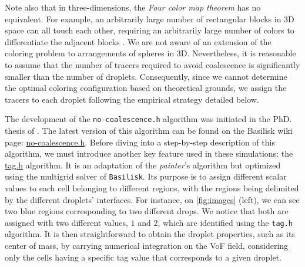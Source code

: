 \documentclass[11pt]{My_preprint}
\begin{document}
Note also that in three-dimensions, the \textit{Four color map theorem} has no equivalent.
For example, an arbitrarily large number of rectangular blocks in 3D space can all touch each other, requiring an arbitrarily large number of colors to differentiate the adjacent blocks \citep{magnant2011coloring}. 
We are not aware of an extension of the coloring problem to arrangements of spheres in 3D. 
Nevertheless, it is reasonable to assume that the number of tracers required to avoid coalescence is significantly smaller than the number of droplets.
Consequently, since we cannot determine the optimal coloring configuration based on theoretical grounds, we assign the tracers to each droplet following the empirical strategy detailed below.

The development of the \texttt{no-coalescence.h} algorithm was initiated in the PhD. thesis of \citet{mani2021numerical}.
The latest version of this algorithm can be found on the Basilisk wiki page: \href{http://basilisk.fr/src/no-coalescence.h}{no-coalescence.h}.
Before diving into a step-by-step description of this algorithm, we must introduce another key feature used in these simulations: the \href{http://basilisk.fr/src/tag.h}{tag.h} algorithm. 
It is an adaptation of the \textit{painter}'s algorithm but optimized using the multigrid solver of \texttt{Basilisk}. 
Its purpose is to assign different scalar values to each cell belonging to different regions, with the regions being delimited by the different droplets' interfaces. 
For instance, on \ref{fig:images} (left), we can see two blue regions corresponding to two different drops.
We notice that both are assigned with two different values, $1$ and $2$, which are identified using the \texttt{tag.h} algorithm. 
It is then straightforward to obtain the droplet properties, such as its center of mass, by carrying numerical integration on the VoF field, considering only the cells having a specific tag value that corresponds to a given droplet.  
\end{document}
